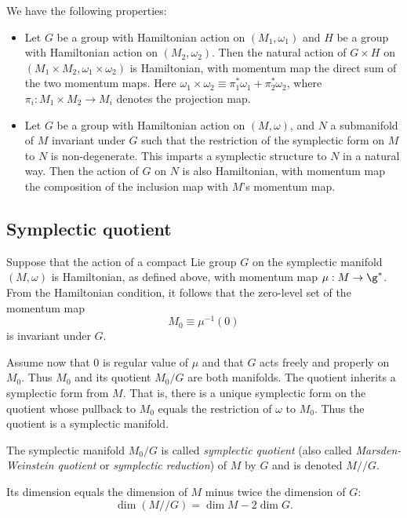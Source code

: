 \documentclass{worksheetclass}
\begin{document}
        \begin{prop}
            We have the following properties:
            \begin{itemize}
                \item Let $G$ be a group with Hamiltonian action on $(M_1,\omega_1)$ and $H$ be a group with Hamiltonian action on $(M_2,\omega_2)$. Then the natural action of $G\times H$ on $(M_{1}\times M_{2},\omega _{1}\times \omega _{2})$ is Hamiltonian, with momentum map the direct sum of the two momentum maps. Here $\omega _{1}\times \omega _{2}\equiv\pi _{1}^{*}\omega _{1}+\pi _{2}^{*}\omega _{2}$, where $\pi_i : M_1 \times M_2 \rightarrow M_i$ denotes the projection map.
                \item Let $G$ be a group with Hamiltonian action on $(M,\omega)$, and $N$ a submanifold of $M$ invariant under $G$ such that the restriction of the symplectic form on $M$ to $N$ is non-degenerate. This imparts a symplectic structure to $N$ in a natural way. Then the action of $G$ on $N$ is also Hamiltonian, with momentum map the composition of the inclusion map with $M$'s momentum map.
            \end{itemize}
        \end{prop}

    \subsection{Symplectic quotient}\label{sec:symplecticquotient}

        Suppose that the action of a compact Lie group $G$ on the symplectic manifold $(M,\omega)$ is Hamiltonian, as defined above, with momentum map $\mu:M\to\g^*$. From the Hamiltonian condition, it follows that the zero-level set of the momentum map
        \begin{equation}
            M_0\equiv\mu^{-1}(0)
        \end{equation}
        is invariant under $G$.

        Assume now that $0$ is regular value of $\mu$ and that $G$ acts freely and properly on $M_0$. Thus $M_0$ and its quotient $M_0/G$ are both manifolds. The quotient inherits a symplectic form from $M$. That is, there is a unique symplectic form on the quotient whose pullback to $M_0$ equals the restriction of $\omega$ to $M_0$. Thus the quotient is a symplectic manifold.

        \begin{defn}
            The symplectic manifold $M_0/G$ is called \emph{symplectic quotient} (also called \emph{Marsden-Weinstein quotient} or \emph{symplectic reduction}) of $M$ by $G$ and is denoted $M//G$\index{$//$}.
        \end{defn}
        Its dimension equals the dimension of $M$ minus twice the dimension of $G$:
        \begin{equation}
            \dim(M//G)=\dim M-2\dim G.
        \end{equation}
\end{document}
